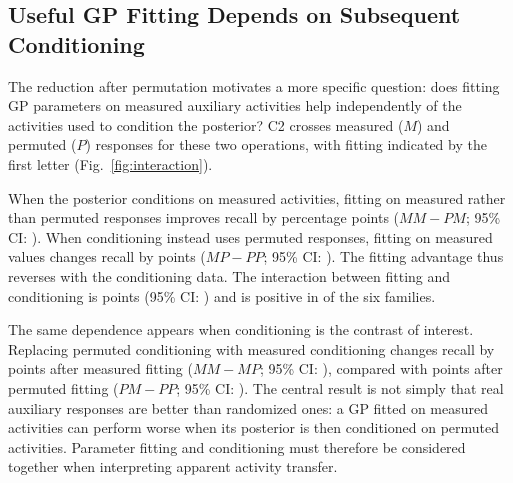 \documentclass[10pt,letterpaper,runningheads]{llncs}
\begin{document}
\subsection{Useful GP Fitting Depends on Subsequent Conditioning}
\label{sec:res-mech}

The reduction after permutation motivates a more specific question:
does fitting GP parameters on measured auxiliary activities help
independently of the activities used to condition the posterior?
C2 crosses measured ($M$) and permuted ($P$) responses for these
two operations, with fitting indicated by the first letter
(Fig.~\ref{fig:interaction}).

When the posterior conditions on measured activities, fitting on
measured rather than permuted responses improves recall by
\crossFitMeasuredResponse{} percentage points ($MM-PM$; 95\% CI:
\crossFitMeasuredResponseCi{}). When conditioning instead uses
permuted responses, fitting on measured values changes recall by
\crossFitPermutedResponse{} points ($MP-PP$; 95\% CI:
\crossFitPermutedResponseCi{}). The fitting advantage thus reverses
with the conditioning data. The interaction between fitting and
conditioning is \crossInteraction{} points (95\% CI:
\crossInteractionCi{}) and is positive in
\crossInteractionPositive{} of the six families.

The same dependence appears when conditioning is the contrast of
interest. Replacing permuted conditioning with measured conditioning
changes recall by \crossResponseMeasuredFit{} points after measured
fitting ($MM-MP$; 95\% CI: \crossResponseMeasuredFitCi{}), compared
with \crossResponsePermutedFit{} points after permuted fitting
($PM-PP$; 95\% CI: \crossResponsePermutedFitCi{}).
The central result is not simply that real auxiliary responses are
better than randomized ones: a GP fitted on measured activities can
perform worse when its posterior is then conditioned on permuted
activities. Parameter fitting and conditioning must therefore be
considered together when interpreting apparent activity transfer.
\end{document}
